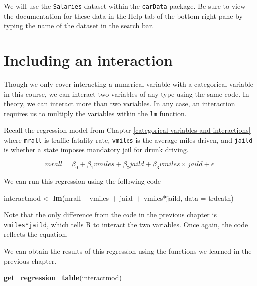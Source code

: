 \documentclass[
]{book}
\newenvironment{Shaded}{\begin{snugshade}}{\end{snugshade}}
\newcommand{\DataTypeTok}[1]{\textcolor[rgb]{0.13,0.29,0.53}{#1}}
\newcommand{\KeywordTok}[1]{\textcolor[rgb]{0.13,0.29,0.53}{\textbf{#1}}}
\newcommand{\NormalTok}[1]{#1}
\newcommand{\OperatorTok}[1]{\textcolor[rgb]{0.81,0.36,0.00}{\textbf{#1}}}
\newcommand{\StringTok}[1]{\textcolor[rgb]{0.31,0.60,0.02}{#1}}
\begin{document}
We will use the \texttt{Salaries} dataset within the \texttt{carData} package. Be sure to view the documentation for these data in the Help tab of the bottom-right pane by typing the name of the dataset in the search bar.

\hypertarget{including-an-interaction}{%
\section{Including an interaction}\label{including-an-interaction}}

Though we only cover interacting a numerical variable with a categorical variable in this course, we can interact two variables of any type using the same code. In theory, we can interact more than two variables. In any case, an interaction requires us to multiply the variables within the \texttt{lm} function.

Recall the regression model from Chapter \ref{categorical-variables-and-interactions} where \texttt{mrall} is traffic fatality rate, \texttt{vmiles} is the average miles driven, and \texttt{jaild} is whether a state imposes mandatory jail for drunk driving.

\begin{equation}
mrall = \beta_0 + \beta_1 vmiles + \beta_2 jaild + \beta_3 vmiles \times jaild + \epsilon
\end{equation}

We can run this regression using the following code

\begin{Shaded}
\begin{Highlighting}[]
\NormalTok{interactmod <-}\StringTok{ }\KeywordTok{lm}\NormalTok{(mrall }\OperatorTok{~}\StringTok{ }\NormalTok{vmiles }\OperatorTok{+}\StringTok{ }\NormalTok{jaild }\OperatorTok{+}\StringTok{ }\NormalTok{vmiles}\OperatorTok{*}\NormalTok{jaild, }\DataTypeTok{data =}\NormalTok{ trdeath)}
\end{Highlighting}
\end{Shaded}

Note that the only difference from the code in the previous chapter is \texttt{vmiles*jaild}, which tells R to interact the two variables. Once again, the code reflects the equation.

We can obtain the results of this regression using the functions we learned in the previous chapter.

\begin{Shaded}
\begin{Highlighting}[]
\KeywordTok{get_regression_table}\NormalTok{(interactmod)}
\end{Highlighting}
\end{Shaded}
\end{document}

